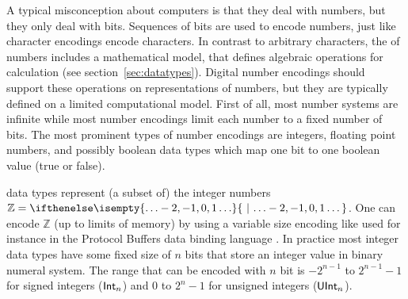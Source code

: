 A typical misconception about computers is that they deal with numbers, but
they only deal with bits.  Sequences of bits are used to encode numbers, just
like character encodings encode characters. In contrast to arbitrary
characters, the  of numbers includes a mathematical model,
that defines algebraic operations for calculation (see
section~\ref{sec:datatypes}).  Digital number encodings should support these
operations on representations of numbers, but they are typically defined on a
limited computational model. First of all, most number systems are infinite
while most number encodings limit each number to a fixed number of bits. The
most prominent types of number encodings are integers, floating point numbers,
and possibly boolean data types which map one bit to one boolean value (true or
false).

 data types represent (a subset of) the integer numbers
$\mathbb{Z}=\set{\ldots-2,-1,0,1\ldots}$. One can encode $\mathbb{Z}$ (up to
limits of memory) by using a variable size encoding like used for instance in
the Protocol Buffers data binding language \cite{Varda2008}.  In practice most
integer data types have some fixed size of $n$ bits that store an integer value
in binary numeral system.  The range that can be encoded with $n$ bit is
$-2^{n-1}$ to $2^{n-1}-1$ for signed integers ($\textsf{Int}_{n}$) and $0$ to
$2^n-1$ for unsigned integers ($\textsf{UInt}_{n}$).

